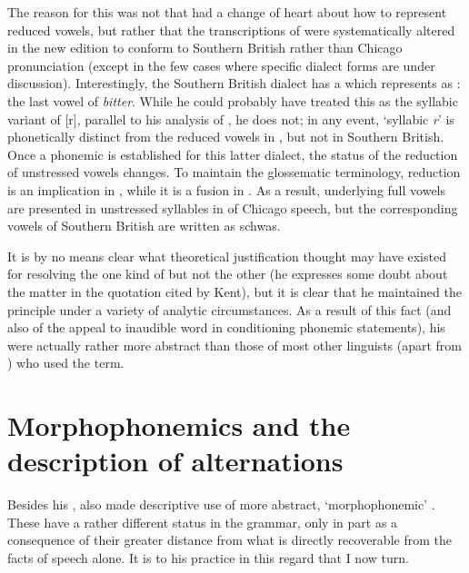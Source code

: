 The reason for this was not that {\Bloomfield} had a change of heart
about how to represent reduced vowels, but rather that the
transcriptions of  were systematically altered in the new
edition to conform to Southern British rather than Chicago
pronunciation (except in the few cases where specific dialect forms
are under discussion). Interestingly, the Southern British dialect has
a  which {\Bloomfield} represents as : the last vowel of
\emph{bitter}. While he could probably have treated this as the
syllabic variant of [r], parallel to his analysis of ,
he does not; in any event, `syllabic \emph{r}' is phonetically
distinct from the reduced vowels in , but not in
Southern British. Once a phonemic  is established for this latter
dialect, the status of the reduction of unstressed vowels changes. To
maintain the glossematic terminology, reduction is an implication in
, while it is a fusion in . As a
result, underlying full vowels are presented in unstressed syllables
in  of Chicago speech, but the corresponding
vowels of Southern British are written as schwas.

It is by no means clear what theoretical justification {\Bloomfield}
thought may have existed for resolving the one kind of  but
not the other (he expresses some doubt about the matter in the
quotation cited by Kent), but it is clear that he maintained the
principle under a variety of analytic circumstances. As a result of
this fact (and also of the appeal to inaudible word  in
conditioning phonemic statements), his  were
actually rather more abstract than those of most other linguists
(apart from {\Hjelmslev}) who used the term.

\section{Morphophonemics and the description of alternations}
\label{sec:bloomfield.morphophonemics}

Besides his , {\Bloomfield} also made descriptive
use of more abstract, `morphophonemic' . These have a
rather different status in the grammar, only in part as a consequence
of their greater distance from what is directly recoverable from the
facts of speech alone. It is to his practice in this regard that I now
turn.

